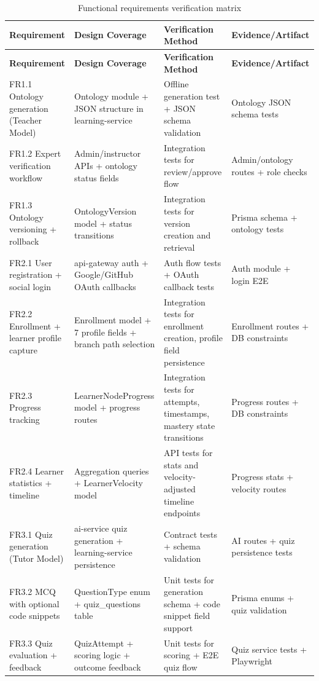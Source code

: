 \begin{longtable}{p{3cm}p{3.5cm}p{3cm}p{4.5cm}}
\caption{Functional requirements verification matrix}
\label{tab:ch04_fr_verification}\\
\toprule
\textbf{Requirement} & \textbf{Design Coverage} & \textbf{Verification Method} & \textbf{Evidence/Artifact} \\
\midrule
\endfirsthead
\toprule
\textbf{Requirement} & \textbf{Design Coverage} & \textbf{Verification Method} & \textbf{Evidence/Artifact} \\
\midrule
\endhead
FR1.1 Ontology generation (Teacher Model) & Ontology module + JSON structure in learning-service & Offline generation test + JSON schema validation & Ontology JSON schema tests \\
FR1.2 Expert verification workflow & Admin/instructor APIs + ontology status fields & Integration tests for review/approve flow & Admin/ontology routes + role checks \\
FR1.3 Ontology versioning + rollback & OntologyVersion model + status transitions & Integration tests for version creation and retrieval & Prisma schema + ontology tests \\
FR2.1 User registration + social login & api-gateway auth + Google/GitHub OAuth callbacks & Auth flow tests + OAuth callback tests & Auth module + login E2E \\
FR2.2 Enrollment + learner profile capture & Enrollment model + 7 profile fields + branch path selection & Integration tests for enrollment creation, profile field persistence & Enrollment routes + DB constraints \\
FR2.3 Progress tracking & LearnerNodeProgress model + progress routes & Integration tests for attempts, timestamps, mastery state transitions & Progress routes + DB constraints \\
FR2.4 Learner statistics + timeline & Aggregation queries + LearnerVelocity model & API tests for stats and velocity-adjusted timeline endpoints & Progress stats + velocity routes \\
FR3.1 Quiz generation (Tutor Model) & ai-service quiz generation + learning-service persistence & Contract tests + schema validation & AI routes + quiz persistence tests \\
FR3.2 MCQ with optional code snippets & QuestionType enum + quiz\_questions table & Unit tests for generation schema + code snippet field support & Prisma enums + quiz validation \\
FR3.3 Quiz evaluation + feedback & QuizAttempt + scoring logic + outcome feedback & Unit tests for scoring + E2E quiz flow & Quiz service tests + Playwright \\

\end{longtable}
